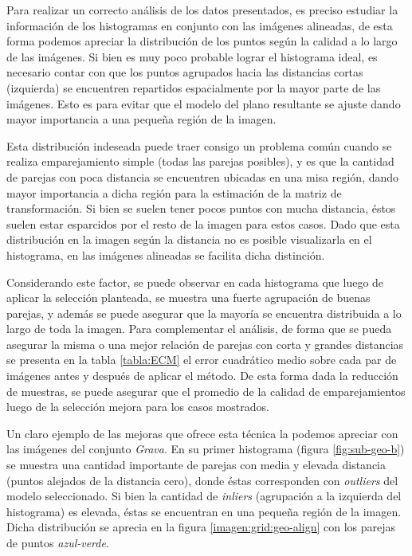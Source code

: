 Para realizar un correcto análisis de los datos presentados, es preciso estudiar la información de los histogramas en conjunto con las imágenes alineadas, de esta forma podemos apreciar la distribución de los puntos según la calidad a lo largo de las imágenes. Si bien es muy poco probable lograr el histograma ideal, es necesario contar con que los puntos agrupados hacia las distancias cortas (izquierda) se encuentren repartidos espacialmente por la mayor parte de las imágenes. Esto es para evitar que el modelo del plano resultante se ajuste dando mayor importancia a una pequeña región de la imagen.

Esta distribución indeseada puede traer consigo un problema común cuando se realiza emparejamiento simple (todas las parejas posibles), y es que la cantidad de parejas con poca distancia se encuentren ubicadas en una misa región, dando mayor importancia a dicha región para la estimación de la matriz de transformación. Si bien se suelen tener pocos puntos con mucha distancia, éstos suelen estar esparcidos por el resto de la imagen para estos casos. Dado que esta distribución en la imagen según la distancia no es posible visualizarla en el histograma, en las imágenes alineadas se facilita dicha distinción.

Considerando este factor, se puede observar en cada histograma que luego de aplicar la selección planteada, se muestra una fuerte agrupación de buenas parejas, y además se puede asegurar que la mayoría se encuentra distribuida a lo largo de toda la imagen. Para complementar el análisis, de forma que se pueda asegurar la misma o una mejor relación de parejas con corta y grandes distancias se presenta en la tabla \ref{tabla:ECM} el error cuadrático medio sobre cada par de imágenes antes y después de aplicar el método. De esta forma dada la reducción de muestras, se puede asegurar que el promedio de la calidad de emparejamientos luego de la selección mejora para los casos mostrados.

Un claro ejemplo de las mejoras que ofrece esta técnica la podemos apreciar con las imágenes del conjunto \textit{Grava}. En su primer histograma (figura \ref{fig:sub-geo-b}) se muestra una cantidad importante de parejas con media y elevada distancia (puntos alejados de la distancia cero), donde éstas corresponden con \textit{outliers} del modelo seleccionado. Si bien la cantidad  de \textit{inliers} (agrupación a la izquierda del histograma) es elevada, éstas se encuentran en una pequeña región de la imagen. Dicha distribución se aprecia en la figura \ref{imagen:grid:geo-align} con los parejas de puntos \textit{azul-verde}. 

